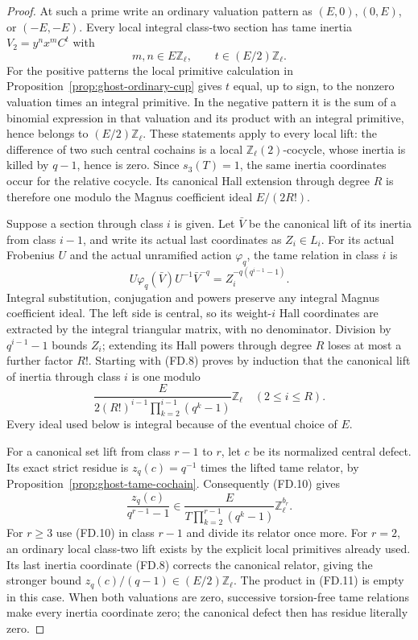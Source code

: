 \begin{proof}
At such a prime write an ordinary valuation
pattern as \((E,0),(0,E)\), or \((-E,-E)\).
Every local integral class-two section has
tame inertia \(V_2=y^n x^m C^t\) with
\[
 m,n\in E\mathbb Z_\ell,
                 \qquad t\in(E/2)\mathbb Z_\ell.
 \tag{FD.8}
\]
For the positive patterns the local primitive
calculation in Proposition~\ref{prop:ghost-ordinary-cup}
gives \(t\) equal, up to sign, to the nonzero
valuation times an integral primitive. In the
negative pattern it is the sum of a binomial
expression in that valuation and its product
with an integral primitive, hence belongs to
\((E/2)\mathbb Z_\ell\). These statements
apply to every local lift: the difference
of two such central cochains is a local
\(\mathbb Z_\ell(2)\)-cocycle, whose inertia
is killed by \(q-1\), hence is zero.
Since \(s_3(T)=1\), the same inertia
coordinates occur for the relative cocycle.
Its canonical Hall extension through degree
\(R\) is therefore one modulo the Magnus
coefficient ideal \(E/(2R!)\).

Suppose a section through class \(i\) is
given. Let \(\bar V\) be the canonical lift
of its inertia from class \(i-1\), and write
its actual last coordinates as \(Z_i\in L_i\).
For its actual Frobenius \(U\) and the
actual unramified action \(\varphi_q\),
the tame relation in class \(i\) is
\[
 U\varphi_q(\bar V)U^{-1}\bar V^{-q}
                  =Z_i^{-q(q^{i-1}-1)}.
 \tag{FD.9}
\]
Integral substitution, conjugation and powers
preserve any integral Magnus coefficient ideal.
The left side is central, so its weight-\(i\)
Hall coordinates are extracted by the integral
triangular matrix, with no denominator.
Division by \(q^{i-1}-1\) bounds \(Z_i\);
extending its Hall powers through degree \(R\)
loses at most a further factor \(R!\).
Starting with (FD.8) proves by induction that
the canonical lift of inertia through class
\(i\) is one modulo
\[
 \frac{E}{2(R!)^{i-1}\prod_{k=2}^{i-1}(q^k-1)}
                                      \mathbb Z_\ell
                    \quad(2\le i\le R).
 \tag{FD.10}
\]
Every ideal used below is integral because
of the eventual choice of \(E\).

For a canonical set lift from class \(r-1\)
to \(r\), let \(c\) be its normalized central
defect. Its exact strict residue is
\(z_q(c)=q^{-1}\) times the lifted tame
relator, by Proposition~\ref{prop:ghost-tame-cochain}.
Consequently (FD.10) gives
\[
 \frac{z_q(c)}{q^{r-1}-1}
 \in
 \frac{E}{T\prod_{k=2}^{r-1}(q^k-1)}
                         \mathbb Z_\ell^{b_r}.
 \tag{FD.11}
\]
For \(r\ge3\) use (FD.10) in class \(r-1\)
and divide its relator once more. For \(r=2\),
an ordinary local class-two lift exists by
the explicit local primitives already used.
Its last inertia coordinate (FD.8) corrects
the canonical relator, giving the stronger
bound \(z_q(c)/(q-1)\in(E/2)\mathbb Z_\ell\).
The product in (FD.11) is empty in this case.
When both valuations are zero, successive
torsion-free tame relations make every
inertia coordinate zero; the canonical
defect then has residue literally zero.


\end{proof}
